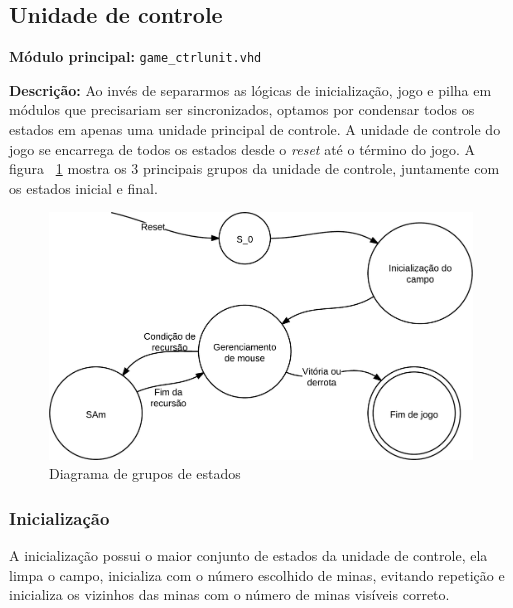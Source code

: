 \documentclass[12pt]{article}
\begin{document}

\subsection{Unidade de controle}
\label{sec:ctrlu}

{\bf Módulo principal:} \verb|game_ctrlunit.vhd|

{\bf Descrição:} Ao invés de separarmos as lógicas de inicialização, jogo e 
pilha em módulos que
precisariam ser sincronizados, optamos por condensar todos os estados em apenas
uma unidade principal de controle. A unidade de controle do jogo se encarrega 
de todos os estados desde o \emph{reset} até o término do jogo. A figura
~\ref{fig:states} mostra os 3 principais grupos da unidade de controle, 
juntamente com os estados inicial e final.

\begin{figure}[ht!]
	\centering
	\vspace{5mm}
	\includegraphics[scale=1]{img/estados.png}
	\vspace{3mm}
	\caption{Diagrama de grupos de estados}
	\label{fig:states}
\end{figure}


\subsubsection{Inicialização}
\label{sec:init}

A inicialização possui o maior conjunto de estados da unidade de controle, ela
limpa o campo, inicializa com o número escolhido de minas, evitando repetição
e inicializa os vizinhos das minas com o número de minas visíveis correto.
\end{document}
